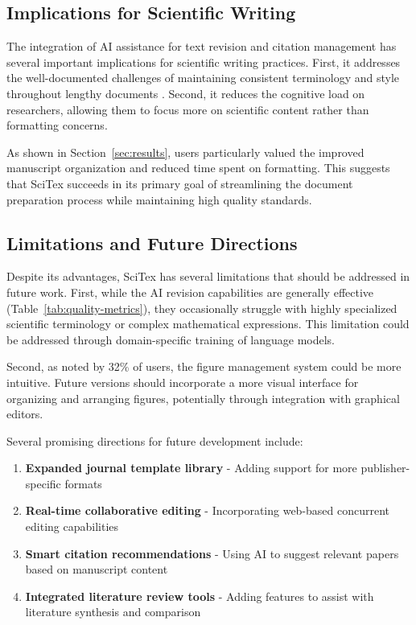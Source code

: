 \documentclass[preprint,review,12pt]{elsarticle}%
\begin{document}
\begin{frontmatter}

\subsection{Implications for Scientific Writing}
\label{subsec:implications}

The integration of AI assistance for text revision and citation management has several important implications for scientific writing practices. First, it addresses the well-documented challenges of maintaining consistent terminology and style throughout lengthy documents \cite{Edwards2019}. Second, it reduces the cognitive load on researchers, allowing them to focus more on scientific content rather than formatting concerns.

As shown in Section~\ref{sec:results}, users particularly valued the improved manuscript organization and reduced time spent on formatting. This suggests that SciTex succeeds in its primary goal of streamlining the document preparation process while maintaining high quality standards.


\subsection{Limitations and Future Directions}
\label{subsec:limitations}

Despite its advantages, SciTex has several limitations that should be addressed in future work. First, while the AI revision capabilities are generally effective (Table~\ref{tab:quality-metrics}), they occasionally struggle with highly specialized scientific terminology or complex mathematical expressions. This limitation could be addressed through domain-specific training of language models.

Second, as noted by 32\% of users, the figure management system could be more intuitive. Future versions should incorporate a more visual interface for organizing and arranging figures, potentially through integration with graphical editors.


Several promising directions for future development include:

\begin{enumerate}
    \item \textbf{Expanded journal template library} - Adding support for more publisher-specific formats
    \item \textbf{Real-time collaborative editing} - Incorporating web-based concurrent editing capabilities
    \item \textbf{Smart citation recommendations} - Using AI to suggest relevant papers based on manuscript content
    \item \textbf{Integrated literature review tools} - Adding features to assist with literature synthesis and comparison
\end{enumerate}


\end{frontmatter}
\end{document}
